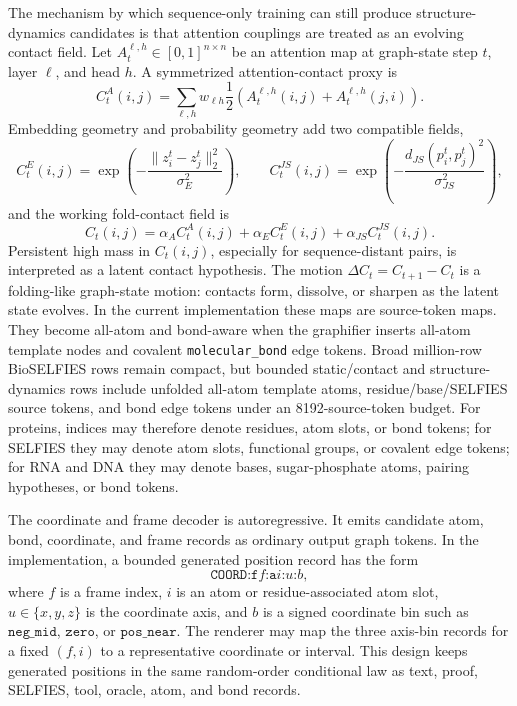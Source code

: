 \documentclass[11pt]{article}
\newcommand{\1}{\mathbf{1}}
\begin{document}
The mechanism by which sequence-only training can still produce structure-dynamics candidates is that attention couplings are treated as an evolving contact field. Let \(A_t^{\ell,h}\in[0,1]^{n\times n}\) be an attention map at graph-state step \(t\), layer \(\ell\), and head \(h\). A symmetrized attention-contact proxy is
\[
  C_t^A(i,j)=\sum_{\ell,h}w_{\ell h}\frac12\left(A_t^{\ell,h}(i,j)+A_t^{\ell,h}(j,i)\right).
\]
Embedding geometry and probability geometry add two compatible fields,
\[
  C_t^E(i,j)=\exp\left(-\frac{\|z_i^t-z_j^t\|_2^2}{\sigma_E^2}\right),
  \qquad
  C_t^{JS}(i,j)=\exp\left(-\frac{d_{JS}(p_i^t,p_j^t)^2}{\sigma_{JS}^2}\right),
\]
and the working fold-contact field is
\[
  C_t(i,j)=\alpha_A C_t^A(i,j)+\alpha_E C_t^E(i,j)+\alpha_{JS}C_t^{JS}(i,j).
\]
Persistent high mass in \(C_t(i,j)\), especially for sequence-distant pairs, is interpreted as a latent contact hypothesis. The motion \(\Delta C_t=C_{t+1}-C_t\) is a folding-like graph-state motion: contacts form, dissolve, or sharpen as the latent state evolves. In the current implementation these maps are source-token maps. They become all-atom and bond-aware when the graphifier inserts all-atom template nodes and covalent \texttt{molecular\_bond} edge tokens. Broad million-row BioSELFIES rows remain compact, but bounded static/contact and structure-dynamics rows include unfolded all-atom template atoms, residue/base/SELFIES source tokens, and bond edge tokens under an 8192-source-token budget. For proteins, indices may therefore denote residues, atom slots, or bond tokens; for SELFIES they may denote atom slots, functional groups, or covalent edge tokens; for RNA and DNA they may denote bases, sugar-phosphate atoms, pairing hypotheses, or bond tokens.

The coordinate and frame decoder is autoregressive. It emits candidate atom, bond, coordinate, and frame records as ordinary output graph tokens. In the implementation, a bounded generated position record has the form
\[
  \texttt{COORD:f}f\texttt{:a}i\texttt{:}u\texttt{:}b,
\]
where \(f\) is a frame index, \(i\) is an atom or residue-associated atom slot, \(u\in\{x,y,z\}\) is the coordinate axis, and \(b\) is a signed coordinate bin such as \(\texttt{neg\_mid}\), \(\texttt{zero}\), or \(\texttt{pos\_near}\). The renderer may map the three axis-bin records for a fixed \((f,i)\) to a representative coordinate or interval. This design keeps generated positions in the same random-order conditional law as text, proof, SELFIES, tool, oracle, atom, and bond records.
\end{document}
